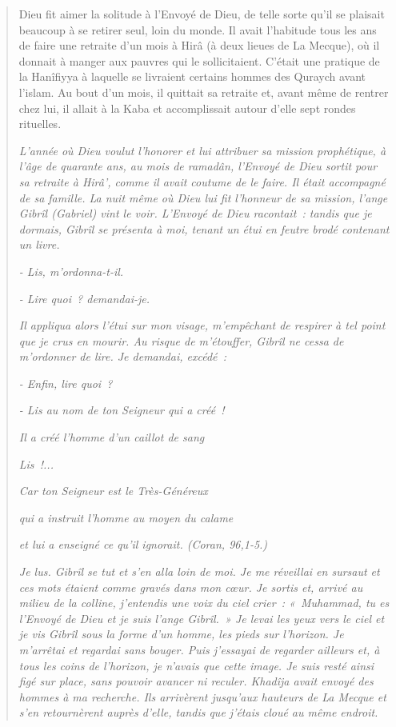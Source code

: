 \begin{quotation}
    

Dieu fit aimer la solitude à l'Envoyé de Dieu, de telle sorte qu'il se
plaisait beaucoup à se retirer seul, loin du monde. Il avait l'habitude
tous les ans de faire une retraite d'un mois à Hirâ (à deux lieues de La
Mecque), où il donnait à manger aux pauvres qui le sollicitaient.
C'était une pratique de la Hanîfiyya à laquelle se livraient certains
hommes des Quraych avant l'islam. Au bout d'un mois, il quittait sa
retraite et, avant même de rentrer chez lui, il allait à la Kaba
et accomplissait autour d'elle sept rondes rituelles.

\emph{L'année où Dieu voulut l'honorer et lui attribuer sa mission
prophétique, à l'âge de quarante ans, au mois de ramadân, l'Envoyé de
Dieu sortit pour sa retraite à Hirâ', comme il avait coutume de le
faire. Il était accompagné de sa famille. La nuit même où Dieu lui fit
l'honneur de sa mission, l'ange Gibrîl (Gabriel) vint le voir. L'Envoyé
de Dieu racontait~: tandis que je dormais, Gibrîl se présenta à moi,
tenant un étui en feutre brodé contenant un livre.}

\emph{- Lis, m'ordonna-t-il.}

\emph{- Lire quoi~? demandai-je.}

\emph{Il appliqua alors l'étui sur mon visage, m'empêchant de respirer à
tel point que je crus en mourir. Au risque de m'étouffer, Gibrîl ne
cessa de m'ordonner de lire. Je demandai, excédé~:}

\emph{- Enfin, lire quoi~?}

\emph{- Lis au nom de ton Seigneur qui a créé~!}

\emph{Il a créé l'homme d'un caillot de sang}

\emph{Lis~!...}

\emph{Car ton Seigneur est le Très-Généreux}

\emph{qui a instruit l'homme au moyen du calame}

\emph{et lui a enseigné ce qu'il ignorait. (Coran, 96,1-5.)}

\emph{Je lus. Gibrîl se tut et s'en alla loin de moi. Je me réveillai en
sursaut et ces mots étaient comme gravés dans mon cœur. Je sortis et,
arrivé au milieu de la colline, j'entendis une voix du ciel crier~:
«~Muhammad, tu es l'Envoyé de Dieu et je suis l'ange Gibrîl.~» Je levai
les yeux vers le ciel et je vis Gibrîl sous la forme d'un homme, les
pieds sur l'horizon. Je m'arrêtai et regardai sans bouger. Puis
j'essayai de regarder ailleurs et, à tous les coins de l'horizon, je
n'avais que cette image. Je suis resté ainsi figé sur place, sans
pouvoir avancer ni reculer. Khadîja avait envoyé des hommes à ma
recherche. Ils arrivèrent jusqu'aux hauteurs de La Mecque et s'en
retournèrent auprès d'elle, tandis que j'étais cloué au même endroit.}


\end{quotation}
